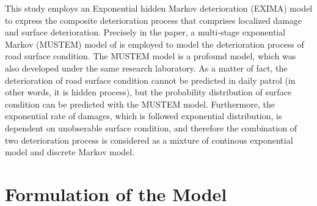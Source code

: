 \documentclass[Journal]{ascelike}
\begin{document}
This study employs an Exponential hidden Markov deterioration (EXIMA) model to express the composite deterioration process that comprises localized damage and surface deterioration. Precisely in the paper, a multi-stage exponential Markov (MUSTEM) model of \cite{kobayashitsuda} is employed to model the deterioration process of road surface condition. The MUSTEM model is a profound model, which was also developed under the same research laboratory. As a matter of fact, the deterioration of road surface condition cannot be predicted in daily patrol (in other words, it is hidden process), but the probability distribution of surface condition can be predicted with the MUSTEM model. Furthermore, the exponential rate of damages, which is followed exponential distribution, is dependent on unobserable surface condition, and therefore the combination of two deterioration process is considered as a mixture of continous exponential model and discrete Markov model. 
%
\section{Formulation of the Model}\label{modelformulation}
\end{document}
